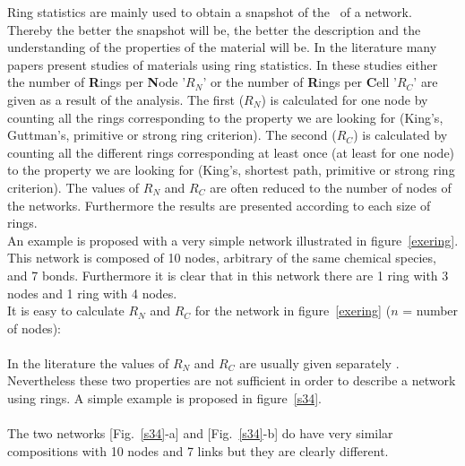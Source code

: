 Ring statistics are mainly used to obtain a snapshot of the \con\ of a network. 
Thereby the better the snapshot will be, the better the description and the understanding of the properties of the material will be. 
In the literature many papers present studies of materials using ring statistics. 
In these studies either the number of {\bf{R}}ings per {\bf{N}}ode '$R_N$' \cite{PhysRevB.47.3053, ginhoven024208} or the number of {\bf{R}}ings per {\bf{C}}ell '$R_C$' \cite{PhysRevB.54.12162, PhysRevB.62.15695, tafen054206} are given as a result of the analysis. 
The first ($R_N$) is calculated for one node by counting all the rings corresponding to the property we are looking for (King's, Guttman's, primitive or strong ring criterion). 
The second ($R_C$) is calculated by counting all the different rings corresponding at least once (at least for one node) to the property we are looking for (King's, shortest path, primitive or strong ring criterion). 
The values of $R_N$ and $R_C$ are often reduced to the number of nodes of the networks. 
Furthermore the results are presented according to each size of rings. \\
An example is proposed with a very simple network illustrated in figure~\ref{exering}. \\ 
\laf This network is composed of 10 nodes, arbitrary of the same chemical species, and 7 bonds. 
Furthermore it is clear that in this network there are 1 ring with 3 nodes and 1 ring with 4 nodes. \\
It is easy to calculate $R_N$ and $R_C$ for the network in figure~\ref{exering} ($n$ = number of nodes): \\
\rnrcsitab
\\ In the literature the values of $R_N$ and $R_C$ are usually given separately \cite{PhysRevB.47.3053, ginhoven024208, PhysRevB.54.12162, PhysRevB.62.15695, tafen054206}. \\
Nevertheless these two properties are not sufficient in order to describe a network using rings. 
A simple example is proposed in figure~\ref{s34}. \\
\\The two networks [Fig.~\ref{s34}-a] and [Fig.~\ref{s34}-b] do have very similar compositions with 10 nodes and 7 links but they are clearly different. 
